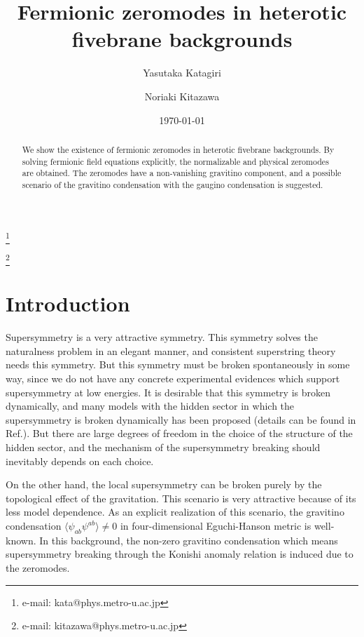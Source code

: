 \documentclass[a4paper,aps, amssymb, preprint, 12pt]{revtex4}
\begin{document}
\parbox{4cm}{\vspace*{2cm}}

\title{Fermionic zeromodes in heterotic fivebrane backgrounds}
\author{Yasutaka Katagiri}
\thanks{e-mail: kata@phys.metro-u.ac.jp}
\address{Department of Physics, Tokyo Metropolitan University, Hachioji, Tokyo 192-0397, Japan}
\date{\today}
\author{Noriaki Kitazawa}
\thanks{e-mail: kitazawa@phys.metro-u.ac.jp}
\address{Department of Physics, Tokyo Metropolitan University, Hachioji, Tokyo 192-0397, Japan}

\begin{abstract}
We show the existence of fermionic zeromodes in heterotic fivebrane backgrounds.
By solving fermionic field equations explicitly, the normalizable and physical zeromodes are obtained.
The zeromodes have a non-vanishing gravitino component, and a possible scenario of the gravitino condensation with the gaugino condensation is suggested.
\end{abstract}

\pacs{}
\maketitle

\newpage

\section{Introduction}
Supersymmetry is a very attractive symmetry.
This symmetry solves the naturalness problem in an elegant manner, and consistent superstring theory needs this symmetry.
But this symmetry must be broken spontaneously in some way, since we do not have any concrete experimental evidences which support supersymmetry at low energies.
It is desirable that this symmetry is broken dynamically, and many models with the hidden sector in which the supersymmetry is broken dynamically has been proposed (details can be found in Ref.\cite{treelevel_SUSY_breaking_1, treelevel_SUSY_breaking_2}).
But there are large degrees of freedom in the choice of the structure of the hidden sector, and the mechanism of the supersymmetry breaking should inevitably depends on each choice.

On the other hand, the local supersymmetry can be broken purely by the topological effect of the gravitation\cite{Witten}.
This scenario is very attractive because of its less model dependence.
As an explicit realization of this scenario, the gravitino condensation $\langle \psi_{ab}\psi^{ab}\rangle\neq 0$ in four-dimensional Eguchi-Hanson metric is well-known\cite{EH, Konishi}.
In this background, the non-zero gravitino condensation which means supersymmetry breaking through the Konishi anomaly relation is induced due to the zeromodes.
\end{document}
